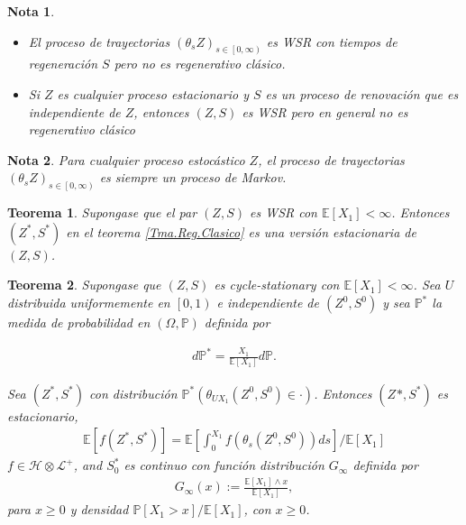 \documentclass{article}
\newtheorem{Teo}{Teorema}[section]
\newtheorem{Note}{Nota}[section]
\newcommand{\esp}{\mathbb{E}}
\newcommand{\prob}{\mathbb{P}}
\numberwithin{equation}{section}
\begin{document}
\begin{Note}
\begin{itemize}
\item El proceso de trayectorias $\left(\theta_{s}Z\right)_{s\in\left[0,\infty\right)}$ es WSR con tiempos de regeneraci\'on $S$ pero no es regenerativo cl\'asico.
\item Si $Z$ es cualquier proceso estacionario y $S$ es un proceso de renovaci\'on que es independiente de $Z$, entonces $\left(Z,S\right)$ es WSR pero en general no es regenerativo cl\'asico
\end{itemize}
\end{Note}


\begin{Note}
Para cualquier proceso estoc\'astico $Z$, el proceso de trayectorias $\left(\theta_{s}Z\right)_{s\in\left[0,\infty\right)}$ es siempre un proceso de Markov.
\end{Note}

\begin{Teo}
Supongase que el par $\left(Z,S\right)$ es WSR con $\esp\left[X_{1}\right]<\infty$. Entonces $\left(Z^{*},S^{*}\right)$ en el teorema \ref{Tma.Reg.Clasico} es una versi\'on estacionaria de  $\left(Z,S\right)$.
\end{Teo}


\begin{Teo}
Supongase que $\left(Z,S\right)$ es cycle-stationary con $\esp\left[X_{1}\right]<\infty$. Sea $U$ distribuida uniformemente en $\left[0,1\right)$ e independiente de $\left(Z^{0},S^{0}\right)$ y sea $\prob^{*}$ la medida de probabilidad en $\left(\Omega,\prob\right)$ definida por 

\begin{eqnarray}d\prob^{*}=\frac{X_{1}}{\esp\left[X_{1}\right]}d\prob.\end{eqnarray} 

Sea $\left(Z^{*},S^{*}\right)$ con distribuci\'on $\prob^{*}\left(\theta_{UX_{1}}\left(Z^{0},S^{0}\right)\in\cdot\right)$. Entonces $\left(Z^{}*,S^{*}\right)$ es estacionario,
\begin{eqnarray}
\esp\left[f\left(Z^{*},S^{*}\right)\right]=\esp\left[\int_{0}^{X_{1}}f\left(\theta_{s}\left(Z^{0},S^{0}\right)\right)ds\right]/\esp\left[X_{1}\right]
\end{eqnarray}
$f\in\mathcal{H}\otimes\mathcal{L}^{+}$, and $S_{0}^{*}$ es continuo con funci\'on distribuci\'on $G_{\infty}$ definida por 
\begin{eqnarray}
G_{\infty}\left(x\right):=\frac{\esp\left[X_{1}\right]\wedge x}{\esp\left[X_{1}\right]},
\end{eqnarray}
para $x\geq0$ y densidad $\prob\left[X_{1}>x\right]/\esp\left[X_{1}\right]$, con $x\geq0$.
\end{Teo}
\end{document}
